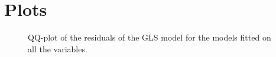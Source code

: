 
\chapter{Plots}
\label{ch:plots}


\begin{figure}
\caption{\label{fig:ResidualGLSAll}QQ-plot of the residuals of the GLS model for the models fitted on all the variables.}
\end{figure}


